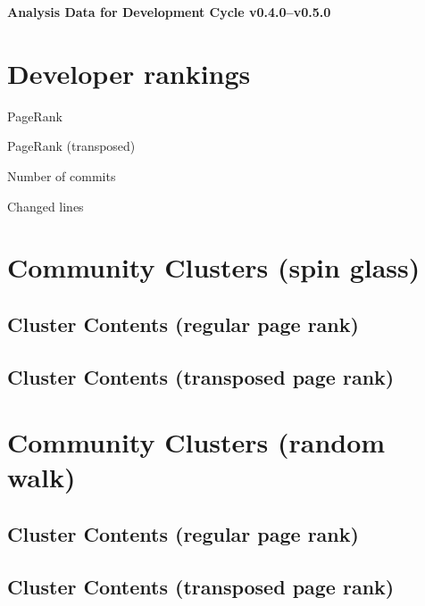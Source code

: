 \documentclass{article}
\begin{document}
\setlength{\parindent}{0pt}
\begin{center}
\begin{Large}
\textbf{Analysis Data for Development Cycle v0.4.0--v0.5.0}
\end{Large}
\end{center}
\section{Developer rankings}
\begin{small}\renewcommand{\tabcolsep}{1pt}
\begin{minipage}{0.5\linewidth}
PageRank\\

\end{minipage}%
\begin{minipage}{0.5\linewidth}
PageRank (transposed)\\

\end{minipage}

\renewcommand{\tabcolsep}{5pt}
\begin{minipage}{0.5\linewidth}
Number of commits\\

\end{minipage}%
\begin{minipage}{0.5\linewidth}
Changed lines\\

\end{minipage}
\end{small}
\newpage\section{Community Clusters (spin glass)}
\subsection{Cluster Contents (regular page rank)}
\newpage\subsection{Cluster Contents (transposed page rank)}
\newpage\section{Community Clusters (random walk)}
\subsection{Cluster Contents (regular page rank)}
\newpage\subsection{Cluster Contents (transposed page rank)}
\end{document}
